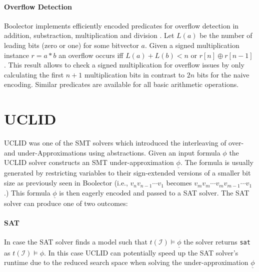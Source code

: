 \paragraph{Overflow Detection}
Boolector implements efficiently encoded predicates for overflow detection in addition, substraction, multiplication and division \cite{Brummayer-PhD}. Let $L\left(a\right)$ be the number of leading bits (zero or one) for some bitvector $a$. Given a signed multiplication instance $r=a*b$ an overflow occurs iff $L\left(a\right) + L\left(b\right) < n$ or $r\left[n\right] \oplus r\left[n-1\right]$ \cite{schulteGokMulOv}. This result allows to check a signed multiplication for overflow issues by only calculating the first $n+1$ multiplication bits in contrast to $2n$ bits for the naive encoding. Similar predicates are available for all basic arithmetic operations.

\section{UCLID}
\textsc{UCLID} \cite{Bryant2007_Chapter_DecidingBit-VectorArithmeticWi-UCLID} was one of the SMT solvers which introduced the interleaving of over- and under-Approximations using abstractions. Given an input formula $\phi$ the \textsc{UCLID} solver constructs an SMT under-approximation $\underline{\phi}$. The formula is usually generated by restricting variables to their sign-extended versions of a smaller bit size as previously seen in Boolector (i.e., $v_nv_{n-1}\dotsi v_1$ becomes $v_mv_m\dotsi v_m v_{m-1}\dotsi v_1$.) This formula $\underline{\phi}$ is then eagerly encoded and passed to a SAT solver. The SAT solver can produce one of two outcomes:

\paragraph{SAT} In case the SAT solver finds a model such that $t\left(\mathcal{I}\right)\vDash\underline{\phi}$ the solver returns \texttt{sat} as $t\left(\mathcal{I}\right)\vDash\phi$. In this case \textsc{UCLID} can potentially speed up the SAT solver's runtime due to the reduced search space when solving the under-approximation $\underline{\phi}$

